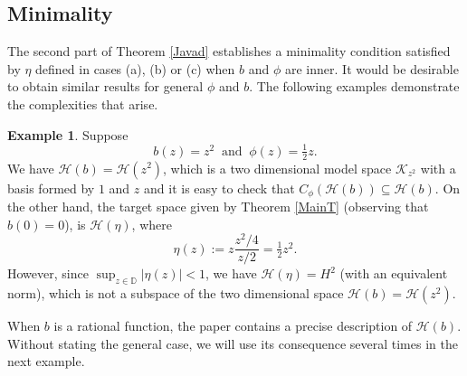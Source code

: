 \documentclass[11pt]{amsart}
\def\D{\mathbb{D}}
\def\HH{{\mathcal H}}
\renewcommand{\subset}{\subseteq}
\numberwithin{equation}{section}
\theoremstyle{plain}
\theoremstyle{definition}
\newtheorem{example}[equation]{Example}
\begin{document}
\subsection*{Minimality}
The second part of Theorem \ref{Javad} establishes a minimality condition satisfied by $\eta$ defined in cases (a), (b) or (c) when $b$ and $\phi$ are inner. It would be desirable to obtain similar results for general $\phi$ and $b$.  
The following examples demonstrate the complexities that arise.
 

	\begin{example}
	    Suppose 
	$$b(z)=z^2  \; \; \mbox{and} \; \; \phi(z)=\tfrac{1}{2} z.$$ We have $\HH(b)=\HH(z^2)$, which is a two dimensional model space $\mathcal{K}_{z^2}$ with a basis formed by $1$ and $z$ \cite[p.~116]{MR3526203} and it is easy to check that  $C_\phi(\HH(b))\subset \HH(b)$. 
	On the other hand, the target space given by Theorem \ref{MainT} (observing that $b(0) = 0$), is $\HH(\eta)$, where
	\[
	\eta(z) :=z\frac{z^2/4}{z/2}=\tfrac{1}{2} z^2.
	\]	However, since $\sup_{z \in \D} |\eta(z)|<1$, we have $\HH(\eta)=H^2$ (with an equivalent norm), which is not a subspace of the two dimensional space $ \HH(b)=\HH(z^2)$.
	\end{example}

    When $b$ is a rational function, the paper \cite{MR3503356} contains  a precise description of $\HH(b)$. Without stating the general case, we will use its consequence several times in the next example.
\end{document}
